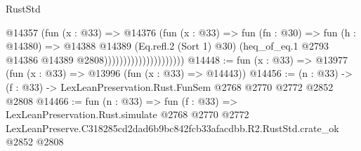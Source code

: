 \begin{lexlean}{RustStd}
\begin{coremodule}
                                      @14357
                                        (fun (x : @33) =>
                                        @14376
                                          (fun (x : @33) =>
                                          fun (fn : @30) =>
                                          fun (h : @14380) =>
                                          @14388
                                            @14389
                                            (Eq.refl.{2} (Sort 1) @30)
                                            (heq_of_eq.{1}
                                              @2793
                                              @14386
                                              @14389
                                              @2808)))))))))))))))))))))
@14448 := fun (x : @33) => @13977 (fun (x : @33) => @13996 (fun (x : @33) => @14443))
@14456 := (n : @33) -> (f : @33) -> LexLeanPreservation.Rust.FunSem @2768 @2770 @2772 @2852 @2808
@14466 := fun (n : @33) =>
  fun (f : @33) =>
  LexLeanPreservation.Rust.simulate
    @2768
    @2770
    @2772
    LexLeanPreserve.C318285cd2dad6b9bc842fcb33afacdbb.R2.RustStd.crate_ok
    @2852
    @2808
\end{coremodule}
\end{lexlean}
